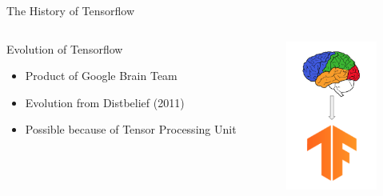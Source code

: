 \documentclass{beamer}
\begin{document}
\begin{frame}[fragile]{The History of Tensorflow}

  \begin{columns}[T]
    \begin{column}{.5\textwidth}
     \begin{block}{Evolution of Tensorflow}
     \begin{itemize}
     \item Product of Google Brain Team
     \item Evolution from Distbelief (2011)
     \item Possible because of Tensor Processing Unit
    \end{itemize}
    \end{block}
    \end{column}
    \begin{column}{.5\textwidth}
    \begin{block}{}
    {\includegraphics[width=3cm]{images/evolution.png}}
    \end{block}
    \end{column}
  \end{columns}

\end{frame}
\end{document}
